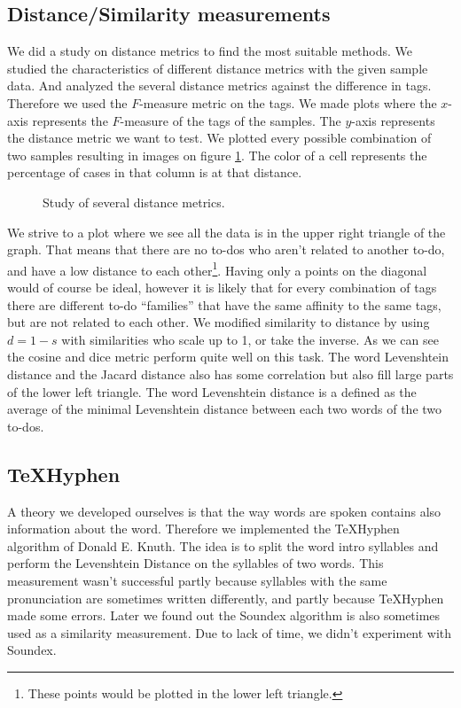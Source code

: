 \documentclass[a4paper,titlepage]{article}
\begin{document}
\subsection{Distance/Similarity measurements}
\label{ss:distanceStudy}
We did a study on distance metrics to find the most suitable methods. We studied the characteristics of different distance metrics with the given sample data. And analyzed the several distance metrics against the difference in tags. Therefore we used the $F$-measure metric on the tags. We made plots where the $x$-axis represents the $F$-measure of the tags of the samples. The $y$-axis represents the distance metric we want to test. We plotted every possible combination of two samples resulting in images on figure \ref{fig:metricStudy}. The color of a cell represents the percentage of cases in that column is at that distance.
\begin{figure}
\centering
{}
\caption{Study of several distance metrics.}
\label{fig:metricStudy}
\end{figure}

We strive to a plot where we see all the data is in the upper right triangle of the graph. That means that there are no to-dos who aren't related to another to-do, and have a low distance to each other\footnote{These points would be plotted in the lower left triangle.}. Having only a points on the diagonal would of course be ideal, however it is likely that for every combination of tags there are different to-do ``families'' that have the same affinity to the same tags, but are not related to each other. We modified similarity to distance by using $d=1-s$ with similarities who scale up to 1, or take the inverse. As we can see the cosine and dice metric perform quite well on this task. The word Levenshtein distance and the Jacard distance also has some correlation but also fill large parts of the lower left triangle. The word Levenshtein distance is a defined as the average of the minimal Levenshtein distance between each two words of the two to-dos.
\subsection{TeXHyphen}
A theory we developed ourselves is that the way words are spoken contains also information about the word. Therefore we implemented the TeXHyphen algorithm\cite[p.376-406]{knuth1986tex} of Donald E. Knuth. The idea is to split the word intro syllables and perform the Levenshtein Distance on the syllables of two words. This measurement wasn't successful partly because syllables with the same pronunciation are sometimes written differently, and partly because TeXHyphen made some errors. Later we found out the Soundex algorithm is also sometimes used as a similarity measurement. Due to lack of time, we didn't experiment with Soundex.
\end{document}
